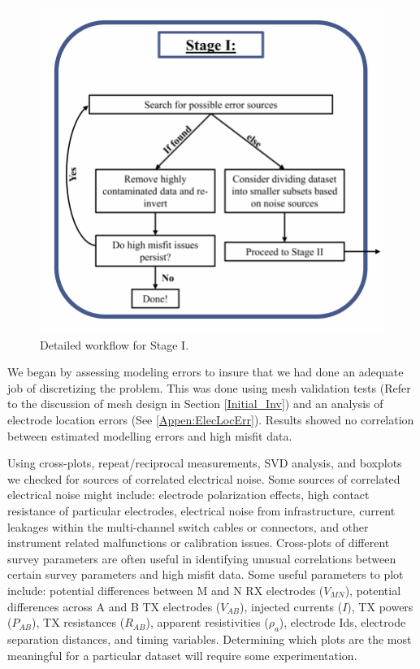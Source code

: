 \documentclass[final,authoryear,5p,times,twocolumn]{elsarticle}
\begin{document}
\begin{figure} [!ht]
\begin{center}
   \includegraphics[trim=0cm 0cm 0cm 0cm, clip=true,width=0.75\linewidth]{./Figures/Fig5.pdf}     
\end{center}
\caption{Detailed workflow for Stage I.}
\label{fig:DataQC_workflow_StageI}
\end{figure}

We began by assessing modeling errors to insure that we had done an adequate job of discretizing the problem. This was done using mesh validation tests (Refer to the discussion of mesh design in Section \ref{Initial_Inv}) and an analysis of electrode location errors (See \ref{Appen:ElecLocErr}). Results showed no correlation between estimated modelling errors and high misfit data. 

Using cross-plots, repeat/reciprocal measurements, SVD analysis, and boxplots we checked for sources of correlated electrical noise. Some sources of correlated electrical noise might include: electrode polarization effects, high contact resistance of particular electrodes, electrical noise from infrastructure, current leakages within the multi-channel switch cables or connectors, and other instrument related malfunctions or calibration issues. Cross-plots of different survey parameters are often useful in identifying unusual correlations between certain survey parameters and high misfit data. Some useful parameters to plot include: potential differences between M and N RX electrodes ($V_{MN}$), potential differences across A and B TX electrodes ($V_{AB}$), injected currents ($I$), TX powers ($P_{AB}$), TX resistances ($R_{AB}$), apparent resistivities ($\rho_a$), electrode Ids, electrode separation distances, and timing variables. Determining which plots are the most meaningful for a particular dataset will require some experimentation.
\end{document}
